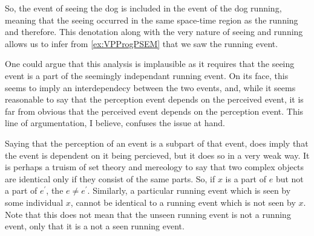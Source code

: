 \documentclass[MilwayThesis]{subfiles}
\begin{document}
So, the event of seeing the dog is included in the event of the dog running, meaning that the seeing occurred in the same space-time region as the running and therefore.
This denotation along with the very nature of seeing and running allows us to infer from \cref{ex:VPProgPSEM} that we saw the running event.

One could argue that this analysis is implausible as it requires that the seeing event is a part of the seemingly independant running event.
On its face, this seems to imply an interdependecy between the two events, and, while it seems reasonable to say that the perception event depends on the perceived event, it is far from obvious that the perceived event depends on the perception event.
This line of argumentation, I believe, confuses the issue at hand.

Saying that the perception of an event is a subpart of that event, does imply that the event is dependent on it being percieved, but it does so in a very weak way.
It is perhaps a truism of set theory and mereology to say that two complex objects are identical only if they consist of the same parts.
So, if $x$ is a part of $e$ but not a part of $e^{\prime}$, the $e \neq e^{\prime}$.
Similarly, a particular running event which is seen by some individual $x$, cannot be identical to a running event which is not seen by $x$.
Note that this does not mean that the unseen running event is not a running event, only that it is a not a seen running event.
\end{document}
